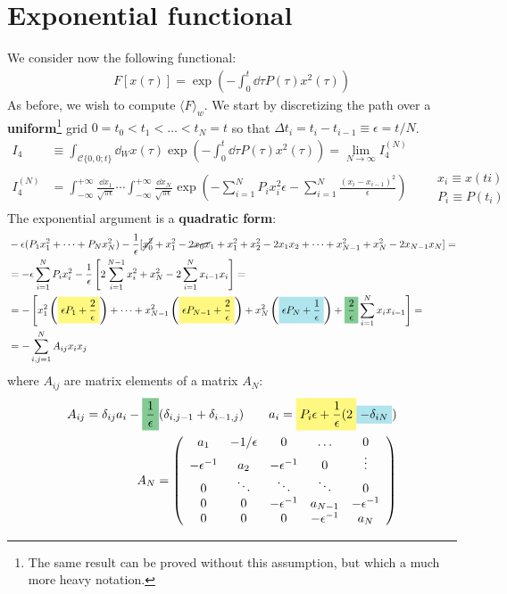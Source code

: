 \documentclass[../template.tex]{subfiles}
\begin{document}
\section{Exponential functional}
We consider now the following functional:
\begin{align*}
    F[x(\tau)] = \exp\left(-\int_0^t \dd{\tau} P(\tau) x^2(\tau) \right) 
\end{align*}
As before, we wish to compute $\langle F \rangle_w$. We start by discretizing the path over a \textbf{uniform}\footnote{The same result can be proved without this assumption, but which a much more heavy notation.}  grid $0 = t_0 < t_1 < \dots < t_N = t$ so that $\Delta t_i = t_i - t_{i-1} \equiv \epsilon = t/N$. 
\begin{align} \nonumber
    I_4 &\equiv \int_{\mathcal{C}\{0,0;t\}} \dd{_Wx(\tau)} \exp\left(-\int_0^t \dd{\tau} P(\tau) x^2(\tau)\right) = \lim_{N \to \infty} I_4^{(N)}\\
    I_4^{(N)} &= \int_{-\infty}^{+\infty} \frac{\dd{x_1}}{\sqrt{ \pi \epsilon}} \cdots \int_{-\infty}^{+\infty} \frac{\dd{x_N}}{\sqrt{\pi \epsilon }} \exp\left(-\sum_{i=1}^N P_i x_i^2 \epsilon - \sum_{i=1}^N \frac{(x_i - x_{i-1})^2}{\epsilon} \right)  \qquad \substack{\displaystyle x_i \equiv x(ti)\\\displaystyle P_i \equiv P(t_i)} \label{eqn:I4N}
\end{align}  
The exponential argument is a \textbf{quadratic form}:
\begin{align*}
    &-\epsilon (P_1 x_1^2 + \dots + P_N x_N^2) - \frac{1}{\epsilon} [\cancel{x_0^2 }+ x_1^2 - \cancel{2x_0 x}_1 + x_1^2 + x_2^2 -2 x_1 x_2 + \dots + x_{N-1}^2 + x_N^2 -2x_{N-1}x_N] =\\
    &=-\epsilon \sum_{i=1}^N P_i x_i^2 - \frac{1}{\epsilon} \left[2 \sum_{i=1}^{N-1} x_i^2 + x_N^2 -2 \sum_{i=1}^N x_{i-1} x_i \right]=\\
    &=-\left[x_1^2 \left(\hlc{Yellow}{\epsilon P_1 + \frac{2}{\epsilon}} \right) + \dots + x^2_{N-1}\left(\hlc{Yellow}{\epsilon P_{N-1} + \frac{2}{\epsilon}} \right) + x_N^2\left(\hlc{SkyBlue}{\epsilon P_N + \frac{1}{\epsilon}} \right)+\hlc{ForestGreen}{\frac{2}{\epsilon}} \sum_{i=1}^N x_i x_{i-1} \right] =\\
    &=- \sum_{i,j=1}^N A_{ij} x_i x_j 
\end{align*} 
where $A_{ij}$ are matrix elements of a matrix $A_N$:
\begin{align*}
    A_{ij} = \delta_{ij} a_i - \hlc{ForestGreen}{\frac{1}{\epsilon}} (\delta_{i,j-1} + \delta_{i-1,j}) \qquad a_i = \hlc{Yellow}{P_i \epsilon + \frac{1}{\epsilon} (2} \hlc{SkyBlue}{- \delta_{iN}})\\
    A_N = \left(\begin{array}{ccccc}
        a_1 & - 1/\epsilon & 0 & \dots & 0 \\ 
        -\epsilon^{-1} & a_2 & -\epsilon^{-1} & 0 & \vdots\\ 
        0 & \ddots & \ddots & \ddots & 0\\ 
        0 & 0 & -\epsilon^{-1} & a_{N-1} & -\epsilon^{-1}\\
        0 & 0 & 0 & -\epsilon^{-1} & a_N
        \end{array}\right)
\end{align*} 
\end{document}
